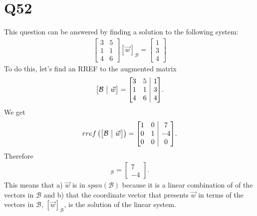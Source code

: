 \documentclass{article}
\makeatletter
\newenvironment{amatrix}[1]{%
  \left[\begin{array}{@{}*{#1}{c}|c@{}}
}{%
  \end{array}\right]
}
\makeatother
\begin{document}
\section*{Q52}
This question can be answered by finding a solution to the following system:
\begin{align*}
    \begin{bmatrix}
        3 &5\\ 1 & 1\\ 4 &6
    \end{bmatrix}
    [\vec w]_{\mathcal{B}} =
    \begin{bmatrix}
        1 \\ 3 \\4
    \end{bmatrix}
\end{align*}
To do this, let's find an RREF to the augmented matrix
\begin{align*}
    \begin{amatrix}{1}
        \mathcal{B} &\vec w
    \end{amatrix} = 
    \begin{amatrix}{2}
        3 &5 &1 \\
        1 &1 & 3\\
        4 &6 & 4
    \end{amatrix}.
\end{align*}
We get
\begin{align*}
    rref\left(
    \begin{amatrix}{1}
        \mathcal{B} &\vec w
    \end{amatrix}\right)= 
    \begin{amatrix}{2}
        1 &0 &7\\
        0 &1 &-4\\
        0 &0 &0
    \end{amatrix}.
\end{align*}
Therefore
\begin{align*}
    [\vec w]_\mathcal{B} = \begin{bmatrix}
        7\\ -4
    \end{bmatrix}.
\end{align*}
This means that a) $\vec w$ is in $span(\mathcal{B})$ because it is a linear combination of of the vectors in $\mathcal{B}$ and b) that the coordinate vector that presents $\vec w$ in terms of the vectors in $\mathcal{B}$, $[\vec w]_\mathcal{B}$, is the solution of the linear system.
\end{document}
